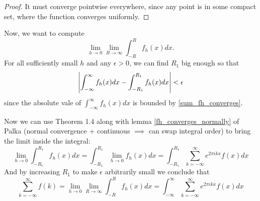 \documentclass{homework}
\begin{document}
\begin{solution}
\begin{proof}
                                                                                It must converge pointwise everywhere, since any point is in some compact set, where the function converges uniformly.
                                                                                \end{proof}
                                                                                Now, we want to compute
                                                                                \[
                                                                                 \lim_{h\to 0}\lim_{R\to \infty} \int_{-R}^R f_h(x)dx.
                                                                                 \]
                                                                                 For all sufficiently small $h$ and any $\epsilon>0$, we can find $R_1$ big enough so that
                                                                                 \[
                                                                                 \left|\int_{-\infty}^\infty f_h(x)dx - \int_{-R_1}^{R_1} f_h(x)dx\right| < \epsilon
                                                                                 \]
                                                                                 since the absolute vale of $\int_{-\infty}^\infty f_h(x)dx$ is bounded by \ref{sum_fh_converges}.


                                                                                 Now we can use Theorem 1.4 along with lemma \ref{fh_converges_normally} of Palka (normal convergence + continuous $\implies$ can swap integral order) to bring the limit inside the integral: 
                                                                                 \[
                                                                                  \lim_{h\to 0} \int_{-R_1}^{R_1} f_h(x)dx = 
                                                                                  \int_{-R_1}^{R_1}\lim_{h\to 0} f_h(x)dx = \int_{-R_1}^{R_1}\sum_{k=-\infty}^\infty e^{2\pi i k x} f(x)dx 
                                                                                  \]
                                                                                  And by increasing $R_1$ to make $\epsilon$ arbitrarily small we conclude that
                                                                                  \[
                                                                                  \sum_{k=-\infty}^\infty f(k) = \lim_{h\to 0} \lim_{R\to \infty} \int_{-R}^{R} f_h(x)dx = \int_{-\infty}^{\infty}\sum_{k=-\infty}^\infty e^{2\pi i k x} f(x)dx 
                                                                                  \]


\end{solution}
\end{document}
